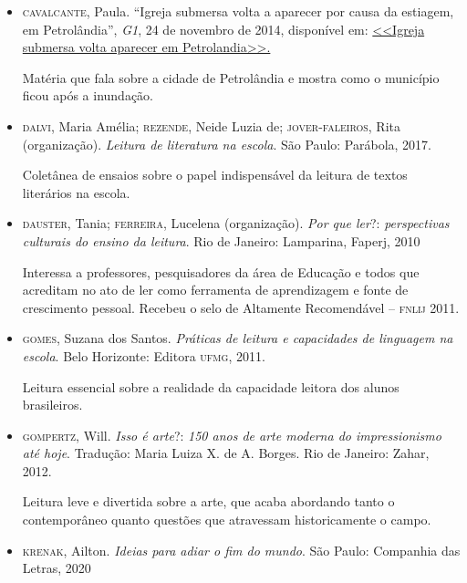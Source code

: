 \documentclass[12pt]{extarticle}
\begin{document}
\begin{itemize}

   \item \textsc{cavalcante}, Paula. ``Igreja submersa volta a aparecer por causa da
    estiagem, em Petrolândia'', \emph{G1}, 24 de novembro de 2014,
    disponível em:
    \href{http://g1.globo.com/pe/caruaru-regiao/noticia/2014/11/igreja-submersa-volta-aparecer-por-causa-da-estiagem-em-petrolandia.html}{<<Igreja submersa volta aparecer em Petrolandia>>.}

    Matéria que fala sobre a cidade de Petrolândia e mostra como o
    município ficou após a inundação.

  \item \textsc{dalvi}, Maria Amélia; \textsc{rezende}, Neide Luzia de; \textsc{jover}-\textsc{faleiros}, Rita
    (organização). \emph{Leitura de literatura na escola}. São Paulo:
    Parábola, 2017.

    Coletânea de ensaios sobre o papel indispensável da leitura de
    textos literários na escola.
\item \textsc{dauster}, Tania; \textsc{ferreira}, Lucelena (organização). \emph{Por que
    ler}?: \emph{perspectivas culturais do ensino da leitura}. Rio de
    Janeiro: Lamparina, Faperj, 2010

    Interessa a professores, pesquisadores da área de Educação e todos
    que acreditam no ato de ler como ferramenta de aprendizagem e fonte
    de crescimento pessoal. Recebeu o selo de Altamente Recomendável --
    \textsc{fnlij} 2011.

\item \textsc{gomes}, Suzana dos Santos. \emph{Práticas de leitura e capacidades de
    linguagem na escola}. Belo Horizonte: Editora \textsc{ufmg}, 2011.

    Leitura essencial sobre a realidade da capacidade leitora dos alunos
    brasileiros.

\item \textsc{gompertz}, Will. \emph{Isso é arte}?: \emph{150 anos de arte moderna
    do impressionismo até hoje}. Tradução: Maria Luiza X. de A. Borges.
    Rio de Janeiro: Zahar, 2012.

    Leitura leve e divertida sobre a arte, que acaba abordando tanto o
    contemporâneo quanto questões que atravessam historicamente o campo.

\item \textsc{krenak}, Ailton. \emph{Ideias para adiar o fim do mundo}. São Paulo:
    Companhia das Letras, 2020


\end{itemize}
\end{document}
